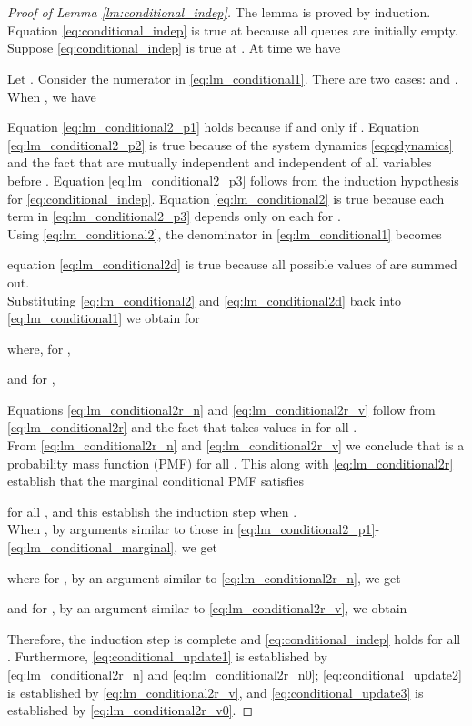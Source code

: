 \documentclass[onecolumn,draftcls]{IEEEtran}
\begin{document}
\appendices
\section{}
\label{app:lm1}
\begin{proof}[Proof of Lemma \ref{lm:conditional_indep}]
The lemma is proved by induction.
Equation \eqref{eq:conditional_indep} is true at  because all queues are initially empty.
Suppose \eqref{eq:conditional_indep} is true at . At time  we have

Let .
Consider the numerator in \eqref{eq:lm_conditional1}. There are two cases:  and .
\\
When , we have

Equation \eqref{eq:lm_conditional2_p1} holds because  if and only if .
Equation \eqref{eq:lm_conditional2_p2} is true because of the system dynamics \eqref{eq:qdynamics} and the fact that
 are mutually independent and independent of all variables before . 
Equation \eqref{eq:lm_conditional2_p3} follows from the induction hypothesis for \eqref{eq:conditional_indep}. 
Equation \eqref{eq:lm_conditional2} is true because each term in \eqref{eq:lm_conditional2_p3} depends only on each  for .
\\
Using \eqref{eq:lm_conditional2}, the denominator in \eqref{eq:lm_conditional1} becomes

equation \eqref{eq:lm_conditional2d} is true because all possible values of  are summed out.
\\
Substituting \eqref{eq:lm_conditional2} and \eqref{eq:lm_conditional2d} back into \eqref{eq:lm_conditional1} we obtain for 

where, for ,

and for ,

Equations \eqref{eq:lm_conditional2r_n} and \eqref{eq:lm_conditional2r_v} follow from \eqref{eq:lm_conditional2r} and the fact that  takes values in  for all .
\\
From \eqref{eq:lm_conditional2r_n} and \eqref{eq:lm_conditional2r_v} we conclude that  is a probability mass function (PMF) for all . This along with \eqref{eq:lm_conditional2r} establish that the marginal conditional PMF satisfies

for all , and this establish the induction step when .
\\
When , by arguments similar to those in \eqref{eq:lm_conditional2_p1}-\eqref{eq:lm_conditional_marginal}, we get

where for , by an argument similar to \eqref{eq:lm_conditional2r_n}, we get

and for , by an argument similar to \eqref{eq:lm_conditional2r_v}, we obtain

Therefore, the induction step is complete and \eqref{eq:conditional_indep} holds for all .
Furthermore, \eqref{eq:conditional_update1} is established by \eqref{eq:lm_conditional2r_n} and \eqref{eq:lm_conditional2r_n0};
\eqref{eq:conditional_update2} is established by \eqref{eq:lm_conditional2r_v}, and \eqref{eq:conditional_update3} is established by \eqref{eq:lm_conditional2r_v0}.

\end{proof}
\end{document}
